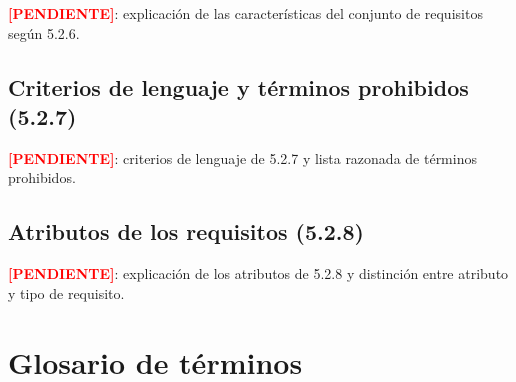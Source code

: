 \documentclass[12pt,a4paper]{article}
\newcommand{\pendiente}[1][]{\textcolor{red}{\textbf{[PENDIENTE#1]}}}
\begin{document}

\pendiente{: explicación de las características del conjunto de
requisitos según 5.2.6.}

\subsection{Criterios de lenguaje y términos prohibidos (5.2.7)}
\label{sec:lenguaje}


\pendiente{: criterios de lenguaje de 5.2.7 y lista razonada de términos
prohibidos.}

\subsection{Atributos de los requisitos (5.2.8)}
\label{sec:atributos}


\pendiente{: explicación de los atributos de 5.2.8 y distinción entre
atributo y tipo de requisito.}

\section{Glosario de términos}
\label{sec:glosario}

\end{document}
